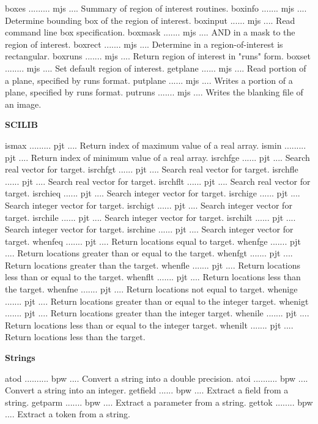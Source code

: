 {\eightpoint\begintt
boxes ......... mjs .... Summary of region of interest routines.
boxinfo ....... mjs .... Determine bounding box of the region of interest.
boxinput ...... mjs .... Read command line box specification.
boxmask ....... mjs .... AND in a mask to the region of interest.
boxrect ....... mjs .... Determine in a region-of-interest is rectangular.
\endtt}
{\eightpoint\begintt
boxruns ....... mjs .... Return region of interest in "runs" form.
boxset ........ mjs .... Set default region of interest.
getplane ...... mjs .... Read portion of a plane, specified by runs format.
putplane ...... mjs .... Writes a portion of a plane, specified by runs format.
putruns ....... mjs .... Writes the blanking file of an image.
\endtt}
\par\centerline{\bf SCILIB}
{\eightpoint\begintt
ismax ......... pjt .... Return index of maximum value of a real array.
ismin ......... pjt .... Return index of minimum value of a real array.
isrchfge ...... pjt .... Search real vector for target.
isrchfgt ...... pjt .... Search real vector for target.
isrchfle ...... pjt .... Search real vector for target.
\endtt}
{\eightpoint\begintt
isrchflt ...... pjt .... Search real vector for target.
isrchieq ...... pjt .... Search integer vector for target.
isrchige ...... pjt .... Search integer vector for target.
isrchigt ...... pjt .... Search integer vector for target.
isrchile ...... pjt .... Search integer vector for target.
\endtt}
{\eightpoint\begintt
isrchilt ...... pjt .... Search integer vector for target.
isrchine ...... pjt .... Search integer vector for target.
whenfeq ....... pjt .... Return locations equal to target.
whenfge ....... pjt .... Return locations greater than or equal to the target.
whenfgt ....... pjt .... Return locations greater than the target.
\endtt}
{\eightpoint\begintt
whenfle ....... pjt .... Return locations less than or equal to the target.
whenflt ....... pjt .... Return locations less than the target.
whenfne ....... pjt .... Return locations not equal to target.
whenige ....... pjt .... Return locations greater than or equal to the integer target.
whenigt ....... pjt .... Return locations greater than the integer target.
whenile ....... pjt .... Return locations less than or equal to the integer target.
whenilt ....... pjt .... Return locations less than the target.
\endtt}
\par\centerline{\bf Strings}
{\eightpoint\begintt
atod .......... bpw .... Convert a string into a double precision.
atoi .......... bpw .... Convert a string into an integer.
getfield ...... bpw .... Extract a field from a string.
getparm ....... bpw .... Extract a parameter from a string.
gettok ........ bpw .... Extract a token from a string.
\endtt}

